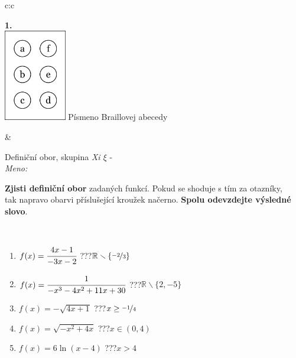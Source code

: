 \documentclass[10pt]{report}
\begin{document}
\begin{tabular}{c:c}
\begin{minipage}[c][104.5mm][t]{0.5\linewidth}
\begin{center}
\begin{minipage}{0.20\linewidth}
\begin{center}
{\Huge\bfseries 1.} \\[2mm]
\includegraphics[height=40mm]{../images/braille.png}
{\small Písmeno Braillovej abecedy}
\end{center}
\end{minipage}
\end{center}
\end{minipage}
&
\begin{minipage}[c][104.5mm][t]{0.5\linewidth}
\begin{center}
\vspace{7mm}
{\huge Definiční obor, skupina \textit{Xi $\xi$} -}\\[5mm]
\textit{Meno:}\phantom{xxxxxxxxxxxxxxxxxxxxxxxxxxxxxxxxxxxxxxxxxxxxxxxxxxxxxxxxxxxxxxxxx}\\[5mm]
\begin{minipage}{0.95\linewidth}
\textbf{Zjisti definiční obor} zadaných funkcí. Pokud se shoduje s tím za otazníky,\\tak napravo obarvi příslušející kroužek načerno. \textbf{Spolu odevzdejte výsledné slovo}.
\end{minipage}
\\[1mm]
\begin{minipage}{0.79\linewidth}
\begin{center}
\begin{varwidth}{\linewidth}
\begin{enumerate}
\normalsizerrr
\item $f(x)=\cfrac{4x-1}{-3x-2}$\quad \dotfill\; ???\;\dotfill \quad $\mathbb{R}\smallsetminus\{\nicefrac{-2}{3}\}$
\item $f(x)=\cfrac{1}{-x^3-4x^2+11x+30}$\quad \dotfill\; ???\;\dotfill \quad $\mathbb{R}\smallsetminus\{2,-5\}$
\item $f(x)=-\sqrt{4x+1}$\quad \dotfill\; ???\;\dotfill \quad $x\geq\nicefrac{-1}{4}$
\item $f(x)=\sqrt{-x^2+4x}$\quad \dotfill\; ???\;\dotfill \quad $x\in(0 , 4)$
\item $f(x)=6\ln{(x-4)}$\quad \dotfill\; ???\;\dotfill \quad $x>4$

\end{enumerate}
\end{varwidth}
\end{center}
\end{minipage}
\end{center}
\end{minipage}
\end{tabular}
\end{document}
